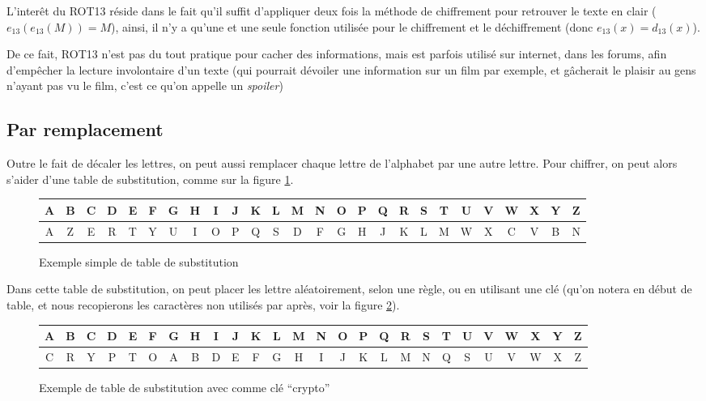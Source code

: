 L'interêt du ROT13 réside dans le fait qu'il suffit d'appliquer deux
fois la méthode de chiffrement pour retrouver le texte en clair
($e_{13}(e_{13}(M)) = M$), ainsi, il n'y a qu'une et une seule fonction utilisée
pour le chiffrement et le déchiffrement (donc $e_{13}(x) = d_{13}(x)$).

De ce fait, ROT13 n'est pas du tout pratique pour cacher des
informations, mais est parfois utilisé sur internet, dans les forums,
afin d'empêcher la lecture involontaire d'un texte (qui pourrait
dévoiler une information sur un film par exemple, et gâcherait le
plaisir au gens n'ayant pas vu le film, c'est ce qu'on appelle un
\emph{spoiler})

\subsection{Par remplacement}
Outre le fait de décaler les lettres, on peut aussi remplacer chaque
lettre de l'alphabet par une autre lettre. Pour chiffrer, on peut alors
s'aider d'une table de substitution, comme sur la figure
\ref{fig:substitutionsimple}.

 \begin{figure}[h]
    \begin{center}
    \begin{tabular}{|c|c|c|c|c|c|c|c|c|c|c|c|c|c|c|c|c|c|c|c|c|c|c|c|c|c|}
      \hline
      A & B & C & D & E & F & G & H & I & J & K & L & M & N & O & P & Q & R & S & T
      & U & V & W & X & Y & Z \\
      \hline
      A & Z & E & R & T & Y & U & I & O & P & Q & S & D & F & G & H & J & K & L & M
      & W & X & C & V & B & N \\
      \hline
    \end{tabular}
  \end{center}
  \caption{Exemple simple de table de substitution}
  \label{fig:substitutionsimple}
\end{figure}

Dans cette table de substitution, on peut placer les lettre
aléatoirement, selon une règle, ou en utilisant une clé (qu'on notera
en début de table, et nous recopierons les caractères non utilisés par
après, voir la figure \ref{fig:substitutioncle}).

\begin{figure}[h]
  \begin{center}
    \begin{tabular}{|c|c|c|c|c|c|c|c|c|c|c|c|c|c|c|c|c|c|c|c|c|c|c|c|c|c|}
      \hline
      A & B & C & D & E & F & G & H & I & J & K & L & M & N & O & P & Q & R & S & T
      & U & V & W & X & Y & Z \\
      \hline
      C & R & Y & P & T & O & A & B & D & E & F & G & H & I & J & K & L & M & N  & Q 
      & S & U & V & W & X & Z \\
      \hline
    \end{tabular}
  \end{center}
  \caption{Exemple de table de substitution avec comme clé ``crypto''}
  \label{fig:substitutioncle}
\end{figure}




